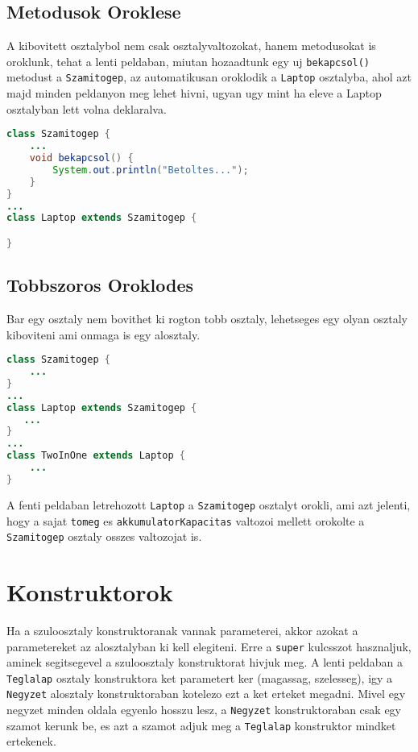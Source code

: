 \documentclass{article}
\let\l\lstinline
\begin{document}
\newpage

\subsection{Metodusok Oroklese}

A kibovitett osztalybol nem csak osztalyvaltozokat, hanem metodusokat is oroklunk, tehat a lenti peldaban, miutan hozaadtunk egy uj \l{bekapcsol()} metodust a \l{Szamitogep}, az automatikusan oroklodik a \l{Laptop} osztalyba, ahol azt majd minden peldanyon meg lehet hivni, ugyan ugy mint ha eleve a Laptop osztalyban lett volna deklaralva.

\begin{lstlisting}[language=Java, caption=A Laptopnak is lesz bekapcsol() fuggvenye]
class Szamitogep {
    ...
    void bekapcsol() {
        System.out.println("Betoltes...");
    }
}
...
class Laptop extends Szamitogep {

}
\end{lstlisting}

\subsection{Tobbszoros Oroklodes}

Bar egy osztaly nem bovithet ki rogton tobb osztaly, lehetseges egy olyan osztaly kiboviteni ami onmaga is egy alosztaly.

\begin{lstlisting}[language=Java, caption=Tobbszintu oroklodes]
class Szamitogep {
    ...
}
...
class Laptop extends Szamitogep {
   ...
}
...
class TwoInOne extends Laptop {
    ...
}
\end{lstlisting}

A fenti peldaban letrehozott \l{Laptop} a \l{Szamitogep} osztalyt orokli, ami azt jelenti, hogy a sajat \l{tomeg} es \l{akkumulatorKapacitas} valtozoi mellett orokolte a \l{Szamitogep} osztaly osszes valtozojat is.

\newpage

\section{Konstruktorok}

Ha a szuloosztaly konstruktoranak vannak parameterei, akkor azokat a parametereket az alosztalyban ki kell elegiteni. Erre a \l{super} kulcsszot hasznaljuk, aminek segitsegevel a szuloosztaly konstruktorat hivjuk meg. A lenti peldaban a \l{Teglalap} osztaly konstruktora ket parametert ker (magassag, szelesseg), igy a \l{Negyzet} alosztaly konstruktoraban kotelezo ezt a ket erteket megadni. Mivel egy negyzet minden oldala egyenlo hosszu lesz, a \l{Negyzet} konstruktoraban csak egy szamot kerunk be, es azt a szamot adjuk meg a \l{Teglalap} konstruktor mindket ertekenek.
\end{document}
